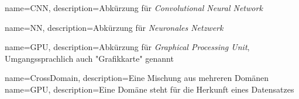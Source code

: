 {
	name={CNN},
	description={Abkürzung für \emph{Convolutional Neural Network}}
}

{
  name={NN},
  description={Abkürzung für \emph{Neuronales Netzwerk}}
}

{
  name={GPU},
  description={Abkürzung für \emph{Graphical Processing Unit}, Umgangssprachlich auch "Grafikkarte" genannt}
}

{
	name={CrossDomain},
	description={Eine Mischung aus mehreren Domänen}
}
{
	name={GPU},
	description={Eine Domäne steht für die Herkunft eines Datensatzes}
}


